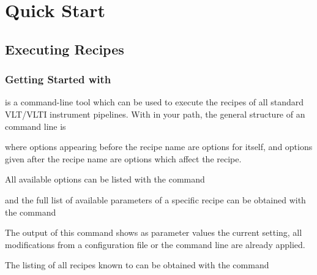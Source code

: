 \section{Quick Start}
\label{sec:cookbook}



\subsection{Executing Recipes}
\label{sec:exec-recipes-quick}


\subsubsection{Getting Started with \esorex{}}
\label{sec:esorex-quick}


\textit{\esorex{}} is a command-line tool which can be used to execute the
recipes of all standard VLT/VLTI instrument pipelines. With \textit{\esorex{}}
in your path, the general structure of an \textit{\esorex{}} 
command line is

\begin{shell}[fontsize=\small]
\end{shell}

where options appearing before the recipe name are options for
\textit{\esorex{}} itself, and options given after the recipe name are options
which affect the recipe. 

All available \textit{\esorex{}} options can be listed with the command
\begin{shell}[fontsize=\small]
\end{shell}

and the full list of available parameters of a specific recipe can be obtained
with the command 

\begin{shell}[fontsize=\small]
\end{shell}
The output of this command shows as parameter values the current setting, \ie
all modifications from a configuration file or the command line are already
applied.

The listing of all recipes known to \textit{\esorex{}} can be obtained with the command
\begin{shell}[fontsize=\small]
\end{shell}

